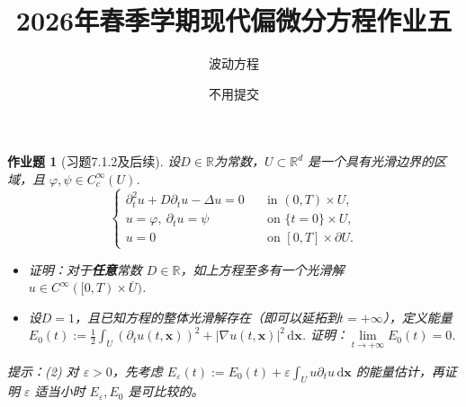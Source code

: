 \documentclass[UTF8,fontset=windows,12pt]{ctexart}
\theoremstyle{kaiti-theorem}
\newtheorem{problem}{作业题}
\numberwithin{equation}{section}
\newcommand{\R}{\mathbb{R}}
\newcommand{\bds}[1]{\boldsymbol{#1}}  %
\newcommand{\vp}{\varphi}
\newcommand{\ub}{{\overline{U}}}
\newcommand{\p}{\partial}
\newcommand{\lap}{\Delta}
\newcommand{\nab}{\nabla}
\newcommand{\dxx}{\,\mathrm{d}\bds{x}}
\newcommand{\iu}{\int_{U}}
\newcommand{\eps}{\varepsilon}
\newcommand{\xx}{{\bds{x}}}
\begin{document}
\title{\LARGE{\bf  2026年春季学期现代偏微分方程作业五}}
\author{波动方程}
\date{不用提交}

\maketitle

\begin{problem}[习题7.1.2及后续]
设$D\in\R$为常数，$U\subset\R^d$ 是一个具有光滑边界的区域，且 $\vp ,\psi\in C_c^\infty(U)$.
\begin{equation*}
\begin{cases}
\p_t^2 u+D\p_t u-\lap u=0~~~&\text{ in }(0,T)\times U,\\
u=\varphi,~\p_t u=\psi~~~&\text{ on }\{t=0\}\times U,\\
u=0~~~&\text{ on }[0,T]\times\p U.
\end{cases}
\end{equation*}
\begin{itemize}
\item [(1)] 证明：对于\textbf{任意}常数 $D\in\R$，如上方程至多有一个光滑解 $u\in C^{\infty}([0,T)\times \ub)$.
\item [(2)] 设$D=1$，且已知方程的整体光滑解存在（即可以延拓到$t=+\infty$），定义能量 $E_0(t):=\frac12\int_U (\p_tu(t,\xx))^2+|\nab u(t,\xx)|^2\dxx$. 证明：$\lim\limits_{t\to+\infty} E_0(t)=0$.
\end{itemize}

提示：(2) 对 $\eps>0$，先考虑 $E_\eps(t):=E_0(t)+\eps\iu u\p_t u\dxx$ 的能量估计，再证明 $\eps$ 适当小时 $E_\eps, E_0$ 是可比较的。
\end{problem}
\end{document}
